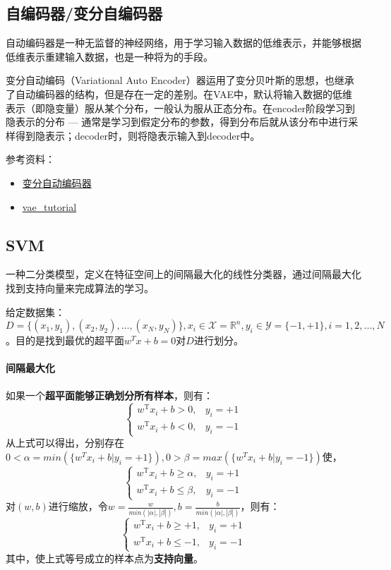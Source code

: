 \subsection{自编码器/变分自编码器}
自动编码器是一种无监督的神经网络，用于学习输入数据的低维表示，并能够根据低维表示重建输入数据，也是一种将为的手段。

变分自动编码（Variational Auto Encoder）器运用了变分贝叶斯的思想，也继承了自动编码器的结构，但是存在一定的差别。在VAE中，默认将输入数据的低维表示（即隐变量）服从某个分布，一般认为服从正态分布。在encoder阶段学习到隐表示的分布 --- 通常是学习到假定分布的参数，得到分布后就从该分布中进行采样得到隐表示；decoder时，则将隐表示输入到decoder中。

参考资料：
\begin{itemize}
	\item \href{https://www.cnblogs.com/kexinxin/p/9858525.html}{变分自动编码器}
	\item \href{https://github.com/cdoersch/vae_tutorial}{vae\_tutorial}
\end{itemize}

\subsection{SVM}
一种二分类模型，定义在特征空间上的间隔最大化的线性分类器，通过间隔最大化找到支持向量来完成算法的学习。

给定数据集：$D = \{(x_1, y_1), (x_2, y_2), ..., (x_N, y_N)\}, x_i \in \mathcal{X} = \mathbb{R}^n, y_i \in \mathcal{Y} = \{-1, +1\}, i = 1, 2, ..., N$。目的是找到最优的超平面$w^T x + b = 0$对$D$进行划分。

\paragraph{间隔最大化}如果一个\textbf{超平面能够正确划分所有样本}，则有：
$$
\begin{cases}
	{w}^{\mathrm{T}} {x}_{i}+b > 0, & y_{i}=+1 \\ 
	{w}^{\mathrm{T}} {x}_{i}+b < 0, & y_{i}=-1
\end{cases}
$$ 
从上式可以得出，分别存在$0 < \alpha = min(\{w^T x_i + b | y_i = +1\}), 0 > \beta = max(\{w^T x_i + b | y_i = -1\})$使，
$$
\begin{cases}
	{w}^{\mathrm{T}} {x}_{i}+b \geqslant \alpha, & y_{i}=+1 \\ 
	{w}^{\mathrm{T}} {x}_{i}+b \leqslant \beta, & y_{i}=-1
\end{cases}
$$
对$(w, b)$进行缩放，令$w = \frac{w}{min(|\alpha|, |\beta|)}, b = \frac{b}{min(|\alpha|, |\beta|)} $，则有：
$$
\begin{cases}
	{w}^{\mathrm{T}} {x}_{i}+b \geqslant +1, & y_{i}=+1 \\ 
	{w}^{\mathrm{T}} {x}_{i}+b \leqslant -1, & y_{i}=-1
\end{cases}
$$
其中，使上式等号成立的样本点为\textbf{支持向量}。

